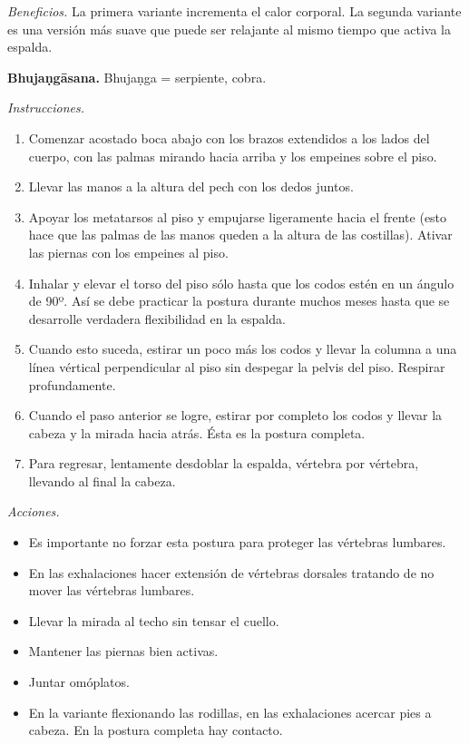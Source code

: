 \emph{Beneficios.} La primera variante
incrementa el calor corporal. La segunda
variante es una versión más suave que puede
ser relajante al mismo tiempo que activa la
espalda.

\medskip\noindent\textbf{Bhujaṇgāsana.}
Bhujaṇga = serpiente, cobra.

\emph{Instrucciones.}
\begin{enumerate}
\item Comenzar acostado boca abajo con los
brazos extendidos a los lados del cuerpo, con
las palmas mirando hacia arriba y los
empeines sobre el piso.
\item Llevar las manos a la altura del pech
con los dedos juntos.
\item Apoyar los metatarsos al piso y
empujarse ligeramente hacia el frente (esto
hace que las palmas de las manos queden a la
altura de las costillas). Ativar las piernas
con los empeines al piso.
\item Inhalar y elevar el torso del piso sólo
hasta que los codos estén en un ángulo de
90º. Así se debe practicar la postura durante
muchos meses hasta que se desarrolle
verdadera flexibilidad en la espalda.
\item Cuando esto suceda, estirar un poco más
los codos y llevar la columna a una línea
vértical perpendicular al piso sin despegar
la pelvis del piso. Respirar profundamente.
\item Cuando el paso anterior se logre,
estirar por completo los codos y llevar la
cabeza y la mirada hacia atrás. Ésta es la
postura completa.
\item Para regresar, lentamente desdoblar la
espalda, vértebra por vértebra, llevando al
final la cabeza.
\end{enumerate}

\emph{Acciones.}
\begin{itemize}
\item Es importante no forzar esta postura
para proteger las vértebras lumbares.
\item En las exhalaciones hacer extensión de
vértebras dorsales tratando de no mover las
vértebras lumbares.
\item Llevar la mirada al techo sin tensar el
cuello.
\item Mantener las piernas bien activas.
\item Juntar omóplatos.
\item En la variante flexionando las
rodillas, en las exhalaciones acercar pies a
cabeza. En la postura completa hay contacto.
\end{itemize}

